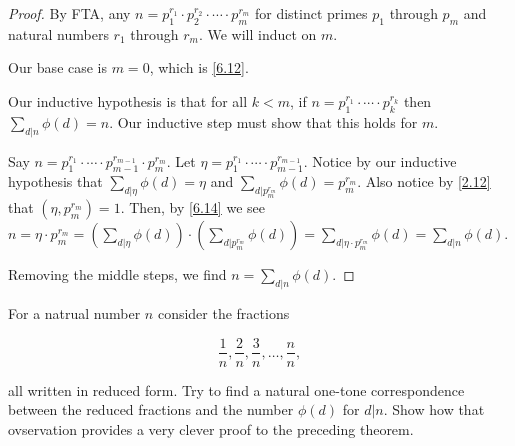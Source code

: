 \documentclass[../main.tex]{subfiles}
\begin{document}
\begin{proof}
  By FTA, any $n = p_1^{r_1} \cdot p_2^{r_2} \cdot \cdots \cdot p_m^{r_m}$ for distinct primes $p_1$ through $p_m$ and natural numbers $r_1$ through $r_m$. We will induct on $m$.

  Our base case is $m = 0$, which is \ref{6.12}.

  Our inductive hypothesis is that for all $k < m$, if $n = p_1^{r_1} \cdot \cdots \cdot p_k^{r_k}$ then $\sum_{d|n} \phi(d) = n$. Our inductive step must show that this holds for $m$.

  Say $n = p_1^{r_1} \cdot \cdots \cdot p_{m-1}^{r_{m-1}} \cdot p_m^{r_m}$. Let $\eta = p_1^{r_1} \cdot \cdots \cdot p_{m-1}^{r_{m-1}}$. Notice by our inductive hypothesis that $\sum_{d|\eta} \phi(d) = \eta$ and $\sum_{d|p_m^{r_m}} \phi(d) = p_m^{r_m}$.
  Also notice by \ref{2.12} that $(\eta, p_m^{r_m}) = 1$. Then, by \ref{6.14} we see $n = \eta \cdot p_m^{r_m} = \left( \sum_{d|\eta} \phi(d) \right) \cdot \left( \sum_{d|p_m^{r_m}} \phi(d) \right) = \sum_{d|\eta \cdot p_m^{r_m}} \phi(d) = \sum_{d|n} \phi(d)$.

  Removing the middle steps, we find $n = \sum_{d|n} \phi(d)$.
\end{proof}



\begin{ex} \label{6.16}
  For a natrual number $n$ consider the fractions

  $$\frac{1}{n}, \frac{2}{n}, \frac{3}{n}, \ldots, \frac{n}{n},$$

  all written in reduced form. Try to find a natural one-tone correspondence between the reduced fractions and the number $\phi(d)$ for $d | n$. Show how that ovservation provides a very clever proof to the preceding theorem.
\end{ex}
\end{document}
